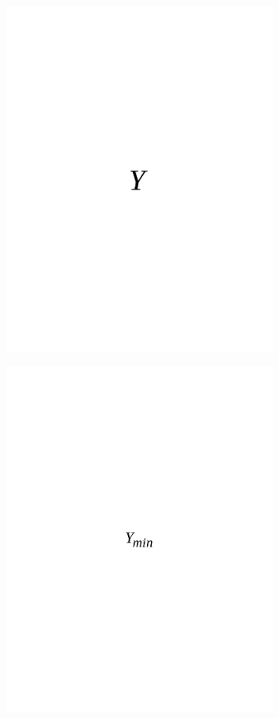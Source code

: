 \begin{figure}[H]
	\centering
	\includegraphics[width=0.8\textwidth]{media/ict/image29}
	\caption*{}
\end{figure}

\begin{figure}[H]
	\centering
	\includegraphics[width=0.8\textwidth]{media/ict/image30}
	\caption*{}
\end{figure}

